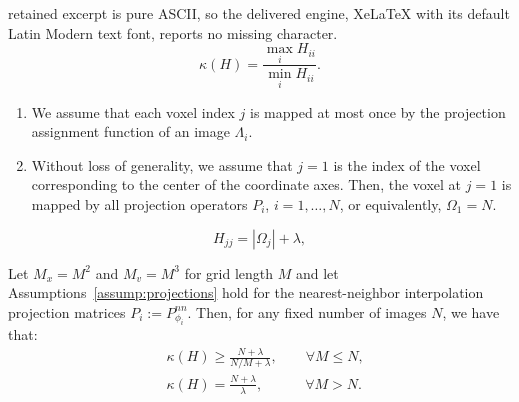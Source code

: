 \documentclass[10pt,a4paper]{amsart}
\begin{document}
retained excerpt is pure ASCII, so the delivered engine, XeLaTeX with its default Latin Modern text font, reports no missing character.
\begin{equation}
    \kappa(H) = \frac{\max_i H_{ii}}{\min_i H_{ii}}.
    \label{eq:cond H}    
\end{equation}

\begin{assumptions}\label{assump:projections}
\begin{enumerate}
    \item We assume that each voxel index $j$ is mapped at most once by the projection
        assignment function of an image $\Lambda_i$.
    \item Without loss of generality, we assume that $j=1$ is the index of the 
        voxel corresponding to the center of the coordinate axes. 
        Then, the voxel at $j=1$ is mapped by all projection operators $P_i$,
        $i=1,\ldots,N$, or equivalently, $\Omega_1 = N$.
\end{enumerate}
\end{assumptions}

\begin{equation}
    H_{jj} = |\Omega_j| + \lambda,
    \label{eq:H diag}
\end{equation}

\begin{proposition}\label{prop:cond}
    Let $M_x = M^2$ and $M_v = M^3 $ for grid length $M$ and let Assumptions~\ref{assump:projections} 
    hold for the nearest-neighbor interpolation projection matrices $P_i := P_{\phi_i}^{nn}$.
    Then, for any fixed number of images $N$, we have that:
    \begin{subequations}
    \begin{align}
        &\kappa(H) \geq \frac{N + \lambda}{N/M + \lambda},
        \qquad \forall M \leq N,
        \label{eq:cond number square lessthan}
        \\
        &\kappa(H) = \frac{N + \lambda}{\lambda},
        \quad\qquad \forall M > N.
    \end{align}
    \label{eq:cond number square}
    \end{subequations}
\end{proposition}
\end{document}
